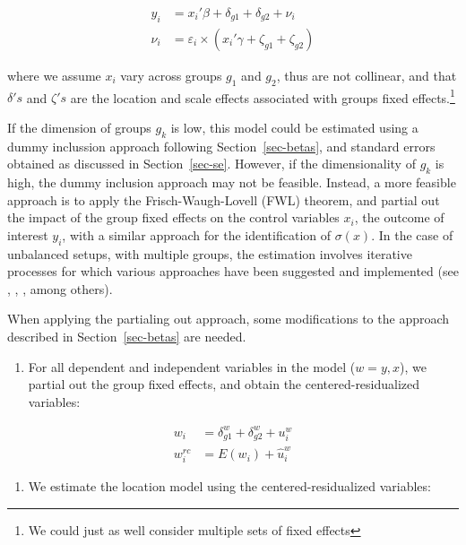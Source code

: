 \documentclass[
  authoryear,
  preprint,
  1p]{elsarticle}
\providecommand{\tightlist}{%
  \setlength{\itemsep}{0pt}\setlength{\parskip}{0pt}}\usepackage{longtable,booktabs,array}
\begin{document}
\[\begin{aligned}
  y_{i} &= x_{i}' \beta + \delta_{g1} + \delta_{g2} + \nu_i \\
  \nu_i &= \varepsilon_i \times (x_{i}' \gamma + \zeta_{g1} + \zeta_{g2})   
  \end{aligned}
\]

where we assume \(x_{i}\) vary across groups \(g_1\) and \(g_2\), thus
are not collinear, and that \(\delta's\) and \(\zeta's\) are the
location and scale effects associated with groups fixed
effects.\footnote{We could just as well consider multiple sets of fixed
  effects}

If the dimension of groups \(g_k\) is low, this model could be estimated
using a dummy inclussion approach following Section~\ref{sec-betas}, and
standard errors obtained as discussed in Section~\ref{sec-se}. However,
if the dimensionality of \(g_k\) is high, the dummy inclusion approach
may not be feasible. Instead, a more feasible approach is to apply the
Frisch-Waugh-Lovell (FWL) theorem, and partial out the impact of the
group fixed effects on the control variables \(x_{i}\), the outcome of
interest \(y_{i}\), with a similar approach for the identification of
\(\sigma(x)\). In the case of unbalanced setups, with multiple groups,
the estimation involves iterative processes for which various approaches
have been suggested and implemented (see
\citet{correia_feasible_nodate}, \citet{gaure2013}, \citet{rios2015},
among others).

When applying the partialing out approach, some modifications to the
approach described in Section~\ref{sec-betas} are needed.

\begin{enumerate}
\def\labelenumi{\arabic{enumi}.}
\tightlist
\item
  For all dependent and independent variables in the model (\(w=y,x\)),
  we partial out the group fixed effects, and obtain the
  centered-residualized variables:
\end{enumerate}

\[\begin{aligned}
w_{i} &= \delta_{g1}^w + \delta_{g2}^w + u_{i}^w \\
w_{i}^{rc} &= E(w_{i}) + \hat{u}_{i}^w
\end{aligned}
\]

\begin{enumerate}
\def\labelenumi{\arabic{enumi}.}
\setcounter{enumi}{1}
\tightlist
\item
  We estimate the location model using the centered-residualized
  variables:
\end{enumerate}
\end{document}
